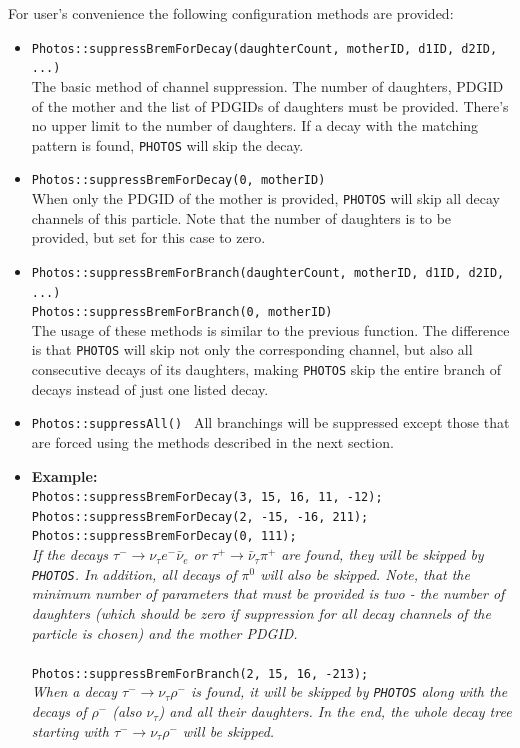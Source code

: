 \documentclass[]{Photos_interface_design}
\begin{document}
For user's convenience the following configuration methods are provided:
\begin{itemize}
 \item {\tt Photos::suppressBremForDecay(daughterCount, motherID, d1ID, d2ID, ...)} \hfill \\
       The basic method of channel suppression. The number of daughters,
	   PDGID of the mother and the list of PDGIDs of daughters must be provided.
	   There's no upper limit to the number of daughters.
	   If a decay with the matching pattern is found, {\tt PHOTOS} will skip the decay.
 \item {\tt Photos::suppressBremForDecay(0, motherID)} \hfill \\
       When only the PDGID of the mother is provided, {\tt PHOTOS} will skip all decay channels
	   of this particle. Note that the number of daughters is to be provided,
	   but  set for  this case to zero.
 \item {\tt Photos::suppressBremForBranch(daughterCount, motherID, d1ID, d2ID, ...)} \hfill \\
       {\tt Photos::suppressBremForBranch(0, motherID)} \hfill \\
       The usage of these methods is similar to the previous function. The difference is
	   that {\tt PHOTOS} will skip not only the corresponding channel,
	   but also all consecutive decays of its daughters, making {\tt PHOTOS} skip the entire branch
	   of decays instead of just one listed decay.
 \item {\tt Photos::suppressAll() }
       All branchings will be suppressed except those that are forced using the methods
	   described in the next section.
 \item \textbf{Example:} \hfill \\
{\tt Photos::suppressBremForDecay(3, 15, 16, 11, -12); } \\
{\tt Photos::suppressBremForDecay(2, -15, -16, 211); } \\
{\tt Photos::suppressBremForDecay(0, 111); } \\
\emph{If the decays $\tau^- \rightarrow \nu_\tau e^- \bar \nu_e$ or
      $\tau^+ \rightarrow \bar \nu_\tau \pi^+$ are found, they will be skipped by {\tt PHOTOS}.
	  In addition, all decays of $\pi^0$ will also be skipped. Note, that the minimum
	  number of parameters that must be provided is two - the number of daughters
	  (which should be zero if suppression for all decay channels of the particle is chosen) 
	  and the mother PDGID.} \\ \\
{\tt Photos::suppressBremForBranch(2, 15, 16, -213); } \\
\emph{When a decay $\tau^- \rightarrow \nu_\tau \rho^-$ is found, it will be skipped by
      {\tt PHOTOS} along with the decays of   $\rho^-$ 
(also $\nu_\tau$) and all
	  their daughters. In the end, the whole decay tree starting with
	  $\tau^- \rightarrow \nu_\tau \rho^-$ will be skipped.}
\end{itemize}
\end{document}
